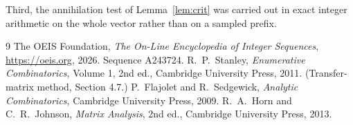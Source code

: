 \documentclass[11pt,a4paper]{article}
\theoremstyle{plain}
\theoremstyle{definition}
\begin{document}
Third, the annihilation test of Lemma~\ref{lem:crit} was carried out in exact integer
arithmetic on the whole vector rather than on a sampled prefix.

\begin{thebibliography}{9}
 The OEIS Foundation, \emph{The On-Line Encyclopedia of Integer
Sequences}, \url{https://oeis.org}, 2026. Sequence A243724.
 R.~P.~Stanley, \emph{Enumerative Combinatorics}, Volume 1, 2nd ed.,
Cambridge University Press, 2011. (Transfer-matrix method, Section 4.7.)
 P.~Flajolet and R.~Sedgewick, \emph{Analytic Combinatorics}, Cambridge
University Press, 2009.
 R.~A.~Horn and C.~R.~Johnson, \emph{Matrix Analysis}, 2nd ed., Cambridge
University Press, 2013.
\end{thebibliography}
\end{document}
